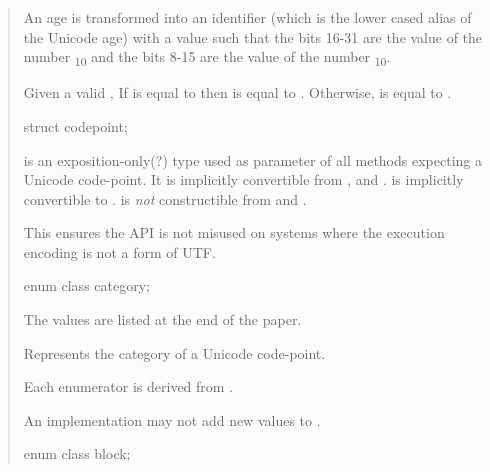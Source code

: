 \documentclass{wg21}
\begin{document}
\begin{quote}
\begin{itemdescr}
An age  is transformed into an identifier  (which is the lower cased alias of the Unicode age) with a value such that the bits 16-31 are the value of the number \textsubscript{10} and the bits 8-15
are the value of the number \textsubscript{10}.

\end{itemdescr}

Given a valid  ,  If  is equal to  then  is equal to .
Otherwise,  is equal to .


\begin{itemdecl}

struct codepoint;

\end{itemdecl}
\begin{itemdescr}
 is an exposition-only(?) type used as parameter of all methods expecting a Unicode code-point. It is implicitly convertible from ,  and .
 is implicitly convertible to .
 is \emph{not} constructible from   and  .

This ensures the API is not misused on systems where the execution encoding is not a form of UTF.

\end{itemdescr}


\begin{itemdecl}
enum class category;

\end{itemdecl}

The values are listed at the end of the paper.

\begin{itemdescr}

Represents the category of a Unicode code-point.

Each enumerator is derived from \cite{PropertyValueAliases}.

\begin{note}
    An implementation may not add new values to .
\end{note}

\end{itemdescr}

\begin{itemdecl}
enum class block;
\end{itemdecl}


\end{quote}
\end{document}
